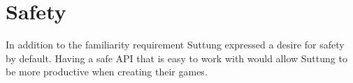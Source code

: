 \section{Safety}
In addition to the familiarity requirement Suttung expressed a desire for safety by default.
Having a safe API that is easy to work with would allow Suttung to be more productive
when creating their games.

